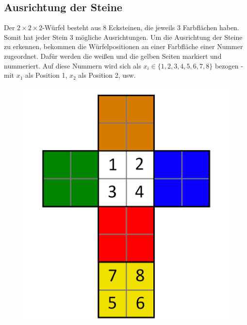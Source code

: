 \documentclass[12pt,a4paper, usenames, dvipsnames]{article}
\begin{document}
\subsection*{Ausrichtung der Steine} 
Der $2\times 2\times 2$-Würfel besteht aus 8 Ecksteinen, die jeweils 3 Farbflächen haben. Somit hat jeder Stein 3 mögliche Ausrichtungen. 
Um die Ausrichtung der Steine zu erkennen, bekommen die Würfelpositionen an einer Farbfläche einer Nummer zugeordnet. Dafür werden die weißen und die gelben Seiten markiert und nummeriert. Auf diese Nummern wird sich als $x_i \in \lbrace 1, 2, 3, 4, 5, 6, 7, 8 \rbrace$ bezogen - mit $x_1$ als Position 1, $x_2$ als Position 2, usw.
\begin{figure}[h]
\centering
\includegraphics[scale=0.1]{foldedout_numbers.png}

\end{figure}
\end{document}
